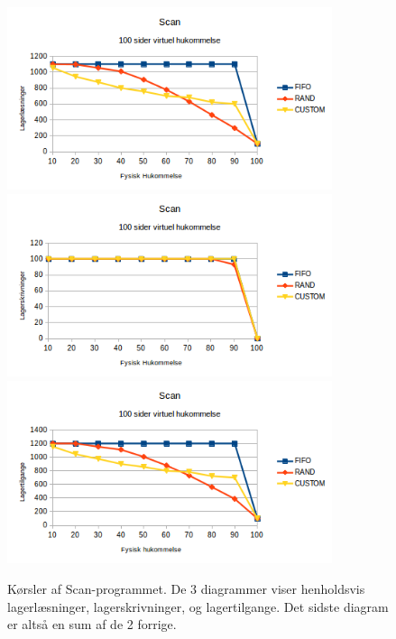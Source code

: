 \begin{figure}[H]
	\centering
	\includegraphics[width=0.85\textwidth]{figures/ScanReads.png}	\includegraphics[width=0.85\textwidth]{figures/ScanWrites.png}	\includegraphics[width=0.85\textwidth]{figures/ScanAccess.png}
	\caption{Kørsler af Scan-programmet. De 3 diagrammer viser henholdsvis lagerlæsninger, lagerskrivninger, og lagertilgange. Det sidste diagram er altså en sum af de 2 forrige.}
	\label{fig:scandisk}
\end{figure}

